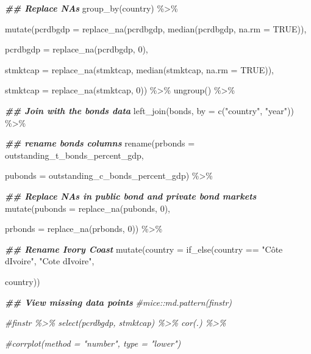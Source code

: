 \documentclass[a4paper,nobind]{templates/ociamthesis}
\newenvironment{Shaded}{\begin{snugshade}}{\end{snugshade}}
\newcommand{\AttributeTok}[1]{\textcolor[rgb]{0.77,0.63,0.00}{#1}}
\newcommand{\CommentTok}[1]{\textcolor[rgb]{0.56,0.35,0.01}{\textit{#1}}}
\newcommand{\ConstantTok}[1]{\textcolor[rgb]{0.00,0.00,0.00}{#1}}
\newcommand{\DecValTok}[1]{\textcolor[rgb]{0.00,0.00,0.81}{#1}}
\newcommand{\DocumentationTok}[1]{\textcolor[rgb]{0.56,0.35,0.01}{\textbf{\textit{#1}}}}
\newcommand{\FunctionTok}[1]{\textcolor[rgb]{0.00,0.00,0.00}{#1}}
\newcommand{\NormalTok}[1]{#1}
\newcommand{\SpecialCharTok}[1]{\textcolor[rgb]{0.00,0.00,0.00}{#1}}
\newcommand{\StringTok}[1]{\textcolor[rgb]{0.31,0.60,0.02}{#1}}
\renewenvironment{Shaded}
{
  \vspace{10pt}%
  \begin{snugshade}%
}{%
  \end{snugshade}%
  \vspace{8pt}%
}
\begin{document}
\begin{Shaded}
\begin{Highlighting}[]
\DocumentationTok{\#\# Replace NAs}
          \FunctionTok{group\_by}\NormalTok{(country) }\SpecialCharTok{\%\textgreater{}\%} 
  
          \FunctionTok{mutate}\NormalTok{(}\AttributeTok{pcrdbgdp =} \FunctionTok{replace\_na}\NormalTok{(pcrdbgdp, }\FunctionTok{median}\NormalTok{(pcrdbgdp, }\AttributeTok{na.rm =} \ConstantTok{TRUE}\NormalTok{)),}
                 
                 \AttributeTok{pcrdbgdp =} \FunctionTok{replace\_na}\NormalTok{(pcrdbgdp, }\DecValTok{0}\NormalTok{),}
                 
                 \AttributeTok{stmktcap =} \FunctionTok{replace\_na}\NormalTok{(stmktcap, }\FunctionTok{median}\NormalTok{(stmktcap, }\AttributeTok{na.rm =} \ConstantTok{TRUE}\NormalTok{)),}
                 
                 \AttributeTok{stmktcap =} \FunctionTok{replace\_na}\NormalTok{(stmktcap, }\DecValTok{0}\NormalTok{)) }\SpecialCharTok{\%\textgreater{}\%} \FunctionTok{ungroup}\NormalTok{() }\SpecialCharTok{\%\textgreater{}\%} 
  
\DocumentationTok{\#\# Join with the bonds data}
  \FunctionTok{left\_join}\NormalTok{(bonds, }\AttributeTok{by =} \FunctionTok{c}\NormalTok{(}\StringTok{"country"}\NormalTok{, }\StringTok{"year"}\NormalTok{)) }\SpecialCharTok{\%\textgreater{}\%} 
  
\DocumentationTok{\#\# rename bonds columns }
  \FunctionTok{rename}\NormalTok{(}\AttributeTok{prbonds =}\NormalTok{ outstanding\_t\_bonds\_percent\_gdp, }
         
         \AttributeTok{pubonds =}\NormalTok{ outstanding\_c\_bonds\_percent\_gdp) }\SpecialCharTok{\%\textgreater{}\%} 
  
  \DocumentationTok{\#\# Replace NAs in public bond and private bond markets }
  \FunctionTok{mutate}\NormalTok{(}\AttributeTok{pubonds =} \FunctionTok{replace\_na}\NormalTok{(pubonds, }\DecValTok{0}\NormalTok{), }
         
         \AttributeTok{prbonds =} \FunctionTok{replace\_na}\NormalTok{(prbonds, }\DecValTok{0}\NormalTok{)) }\SpecialCharTok{\%\textgreater{}\%} 
  
         \DocumentationTok{\#\# Rename Ivory Coast}
         \FunctionTok{mutate}\NormalTok{(}\AttributeTok{country =} \FunctionTok{if\_else}\NormalTok{(country }\SpecialCharTok{==} \StringTok{"Côte d\textquotesingle{}Ivoire"}\NormalTok{, }\StringTok{"Cote d\textquotesingle{}Ivoire"}\NormalTok{, }
                                  
\NormalTok{                                  country))}

\DocumentationTok{\#\# View missing data points}
\CommentTok{\#mice::md.pattern(finstr)}

\CommentTok{\#finstr \%\textgreater{}\% select(pcrdbgdp, stmktcap) \%\textgreater{}\% cor(.) \%\textgreater{}\% }
  
  \CommentTok{\#corrplot(method = "number", type = "lower")}
\end{Highlighting}
\end{Shaded}
\end{document}
